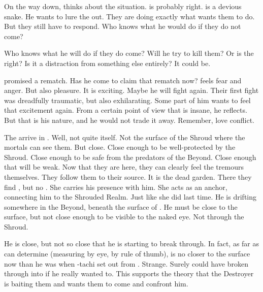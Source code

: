 On the way down, \Teshrial thinks about the situation.
\Ganethed is probably right. 
\Ishnaruchaefir is a devious snake. 
He wants to lure the \resphain out. 
They are doing exactly what \Ishnaruchaefir wants them to do. 
But they still have to respond.
Who knows what he would do if they do not come?

Who knows what he will do if they do come?
Will he try to kill them? 
Or is the \bezed right?
Is it a distraction from something else entirely?
It could be.

\Ishnaruchaefir promised \Teshrial a rematch.
Has he come to claim that rematch now?
\Teshrial feels fear and anger. 
But also pleasure.
It is exciting.
Maybe he will fight \Ishnaruchaefir again.
Their first fight was dreadfully traumatic, but also exhilarating.
Some part of him wants to feel that excitement again.
From a certain point of view that is insane, he reflects.
But that is his \resphan nature, and he would not trade it away.
Remember, \resphain love conflict. 



\begin{comment}
  \section{Arrival in \Malcur}
\end{comment}
\new
The \resphain arrive in \Malcur.
Well, not quite \Malcur itself.
Not the surface of the Shroud where the mortals can see them. 
But close. 
Close enough to be well-protected by the Shroud. 
Close enough to be safe from the predators of the Beyond. 
Close enough that \Ishnaruchaefir will be weak. 
Now that they are here, they can clearly feel the tremours themselves. 
They follow them to their source. 
It is the dead garden.
There they find \Criseis, but no \Ishnaruchaefir. 
She carries his presence with him.
She acts as an anchor, connecting him to the Shrouded Realm. 
Just like she did last time. 
He is drifting somewhere in the Beyond, beneath the surface of \Azmith. 
He must be close to the surface, but not close enough to be visible to the naked eye. 
Not through the Shroud.

He is close, but not so close that he is starting to break through.
In fact, as far as \Teshrial can determine (measuring by eye, by rule of thumb), \Ishnaruchaefir is no closer to the surface now than he was when \Teshrial-tachi set out from \Nyx.
Strange.
Surely \Ishnaruchaefir could have broken through into \Malcur if he really wanted to.
This supports the theory that the Destroyer is baiting them and wants them to come and confront him. 



